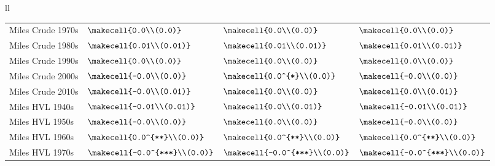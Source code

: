 \begin{tabular}{ll}
\begin{tabular}{llll}
Miles Crude 1970s   &           $\makecell{0.0\\(0.0)}$ &          $\makecell{0.0\\(0.0)}$ &           $\makecell{0.0\\(0.0)}$ \\
Miles Crude 1980s   &         $\makecell{0.01\\(0.01)}$ &        $\makecell{0.01\\(0.01)}$ &         $\makecell{0.01\\(0.01)}$ \\
Miles Crude 1990s   &           $\makecell{0.0\\(0.0)}$ &          $\makecell{0.0\\(0.0)}$ &           $\makecell{0.0\\(0.0)}$ \\
Miles Crude 2000s   &          $\makecell{-0.0\\(0.0)}$ &      $\makecell{0.0^{*}\\(0.0)}$ &          $\makecell{-0.0\\(0.0)}$ \\
Miles Crude 2010s   &         $\makecell{-0.0\\(0.01)}$ &          $\makecell{0.0\\(0.0)}$ &          $\makecell{0.0\\(0.01)}$ \\
Miles HVL 1940s     &        $\makecell{-0.01\\(0.01)}$ &         $\makecell{0.0\\(0.01)}$ &        $\makecell{-0.01\\(0.01)}$ \\
Miles HVL 1950s     &          $\makecell{-0.0\\(0.0)}$ &          $\makecell{0.0\\(0.0)}$ &          $\makecell{-0.0\\(0.0)}$ \\
Miles HVL 1960s     &      $\makecell{0.0^{**}\\(0.0)}$ &     $\makecell{0.0^{**}\\(0.0)}$ &      $\makecell{0.0^{**}\\(0.0)}$ \\
Miles HVL 1970s     &    $\makecell{-0.0^{***}\\(0.0)}$ &   $\makecell{-0.0^{***}\\(0.0)}$ &    $\makecell{-0.0^{***}\\(0.0)}$ \\

\end{tabular}
\end{tabular}
